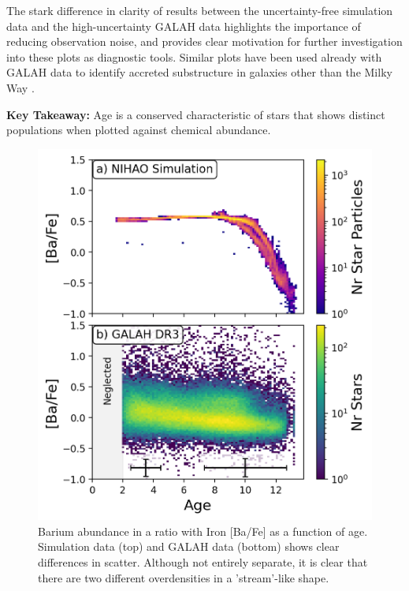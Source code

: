 \documentclass[fleqn,usenatbib]{mnras}
\begin{document}
The stark difference in clarity of results between the uncertainty-free simulation data and the high-uncertainty GALAH data highlights the importance of reducing observation noise, and provides clear motivation for further investigation into these plots as diagnostic tools. Similar plots have been used already with GALAH data to identify accreted substructure in galaxies other than the Milky Way \citep{Martig2021}.

\textbf{Key Takeaway:} Age is a conserved characteristic of stars that shows distinct populations when plotted against chemical abundance.

\begin{figure}
	\includegraphics[width=\columnwidth]{figures/Ba_Fe_time.png}
    \caption{Barium abundance in a ratio with Iron [Ba/Fe] as a function of age. Simulation data (top) and GALAH data (bottom) shows clear differences in scatter. Although not entirely separate, it is clear that there are two different overdensities in a 'stream'-like shape.}
    \label{fig:BaFetime}
\end{figure}
\end{document}
